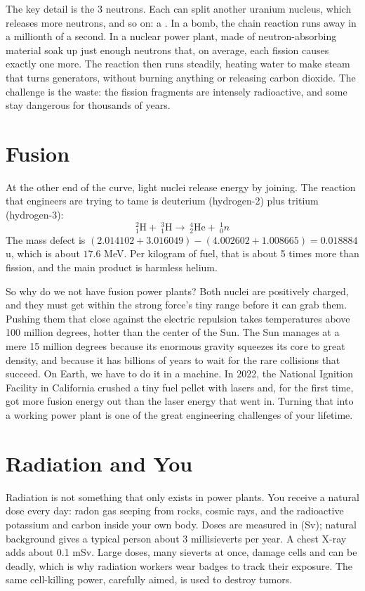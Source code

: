 The key detail is the 3 neutrons. Each can split another uranium nucleus, which releases more neutrons,
and so on: a . In a bomb, the chain reaction runs away in a millionth of a second.
In a nuclear power plant,  made of neutron-absorbing material soak up just enough
neutrons that, on average, each fission causes exactly one more. The reaction then runs steadily, heating
water to make steam that turns generators, without burning anything or releasing carbon dioxide. The
challenge is the waste: the fission fragments are intensely radioactive, and some stay dangerous for
thousands of years.

\section{Fusion}
At the other end of the curve, light nuclei release energy by joining. The reaction that engineers are
trying to tame is deuterium (hydrogen-2) plus tritium (hydrogen-3):
$$^2_1\text{H} +\ ^3_1\text{H} \to\ ^4_2\text{He} +\ ^1_0n$$
The mass defect is
$(2.014102 + 3.016049) - (4.002602 + 1.008665) = 0.018884$ u, which is about $17.6$ MeV. Per kilogram of
fuel, that is about 5 times more than fission, and the main product is harmless helium.

So why do we not have fusion power plants? Both nuclei are positively charged, and they must get within the
strong force's tiny range before it can grab them. Pushing them that close against the electric repulsion
takes temperatures above 100 million degrees, hotter than the center of the Sun. The Sun manages at a mere
15 million degrees because its enormous gravity squeezes its core to great density, and because it has
billions of years to wait for the rare collisions that succeed. On Earth, we have to do it in a machine. In
2022, the National Ignition Facility in California crushed a tiny fuel pellet with lasers and, for the
first time, got more fusion energy out than the laser energy that went in. Turning that into a working power
plant is one of the great engineering challenges of your lifetime.

\section{Radiation and You}
Radiation is not something that only exists in power plants. You receive a natural 
dose every day: radon gas seeping from rocks, cosmic rays, and the radioactive potassium and carbon
inside your own body. Doses are measured in  (Sv); natural background gives a typical person about
3 millisieverts per year. A chest X-ray adds about 0.1 mSv. Large doses, many sieverts at once, damage cells
and can be deadly, which is why radiation workers wear badges to track their exposure. The same
cell-killing power, carefully aimed, is used to destroy tumors.

